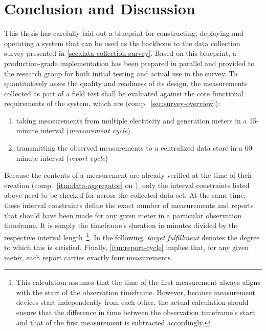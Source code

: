 
\chapter{Conclusion and Discussion}
\label{chp:conclusion}

This thesis has carefully laid out a blueprint for constructing, deploying and operating a system that can be used as the backbone to the data collection survey presented in \autoref{sec:data-collection-survey}. Based on this blueprint, a production-grade implementation has been prepared in parallel and provided to the research group for both initial testing and actual use in the survey. To quantitatively asses the quality and readiness of its design, the measurements collected as part of a field test shall be evaluated against the core functional requirements of the system, which are (comp.~\autoref{sec:survey-overview}):

\begin{enumerate}[label=(\Alph*)]
  \item taking measurements from multiple electricity and generation meters in a 15-minute interval (\textit{measurement cycle}) \label{itm:measurement-cycle}
  \item transmitting the observed measurements to a centralized data store in a \mbox{60-minute} interval (\textit{report cycle}) \label{itm:report-cycle}
\end{enumerate}

Because the contents of a measurement are already verified at the time of their creation (comp.~\ref{itm:data-aggregator} on ), only the interval constraints listed above need to be checked for across the collected data set. At the same time, these interval constraints define the exact number of measurements and reports that should have been made for any given meter in a particular observation timeframe. It is simply the timeframe's duration in minutes divided by the respective interval length~\footnote{This calculation assumes that the time of the first measurement always aligns with the start of the observation timeframe. However, because measurement devices start independently from each other, the actual calculation should ensure that the difference in time between the observation timeframe's start and that of the first measurement is subtracted accordingly.}. In the following, \textit{target fulfillment} denotes the degree to which this is satisfied. Finally, \ref{itm:report-cycle} implies that, for any given meter, each report carries exactly four measurements. 

